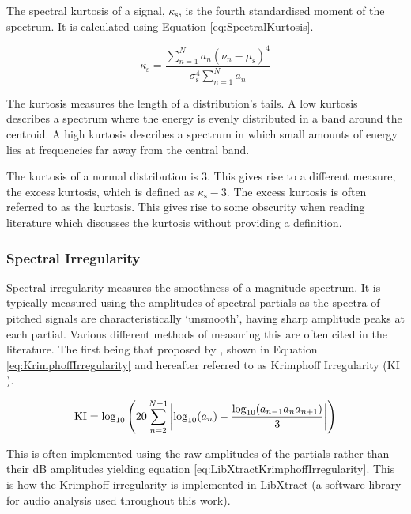 			The spectral kurtosis of a signal, $\kappa_{\mathrm{s}}$, is the fourth standardised moment of the
			spectrum. It is calculated using Equation \ref{eq:SpectralKurtosis}.

			\begin{equation}
				\kappa_{\mathrm{s}} = \frac{\sum_{n = 1}^{N} a_{n}(\nu_{n} - \mu_{\mathrm{s}})^{4}}
					{\sigma_{\mathrm{s}}^{4}\sum_{n = 1}^{N} a_{n}}
				\label{eq:SpectralKurtosis}
			\end{equation}

			The kurtosis measures the length of a distribution's tails. A low kurtosis describes a spectrum
			where the energy is evenly distributed in a band around the centroid. A high kurtosis describes a
			spectrum in which small amounts of energy lies at frequencies far away from the central band.

			The kurtosis of a normal distribution is 3. This gives rise to a different measure, the excess
			kurtosis, which is defined as $\kappa_{\mathrm{s}} - 3$. The excess kurtosis is often referred to
			as the kurtosis. This gives rise to some obscurity when reading literature which discusses the
			kurtosis without providing a definition.

		\subsubsection*{Spectral Irregularity}
			Spectral irregularity measures the smoothness of a magnitude spectrum. It is typically measured
			using the amplitudes of spectral partials as the spectra of pitched signals are characteristically
			`unsmooth', having sharp amplitude peaks at each partial. Various different methods of measuring
			this are often cited in the literature. The first being that proposed by
			\citet{krimphoff1994caracterisation}, shown in Equation \ref{eq:KrimphoffIrregularity} and
			hereafter referred to as Krimphoff Irregularity ($\mathrm{KI}$).

			\begin{equation}
				\mathrm{KI} = \log_{10} \left( 20 \sum_{n = 2}^{N - 1}
						   \left|\log_{10}(a_{n}) - \frac{\log_{10}(a_{n-1}a_{n}a_{n+1})}{3}\right|
						   \right)
				\label{eq:KrimphoffIrregularity}
			\end{equation}

			This is often implemented using the raw amplitudes of the partials rather than their dB amplitudes
			yielding equation \ref{eq:LibXtractKrimphoffIrregularity}. This is how the Krimphoff irregularity
			is implemented in LibXtract \citep{bullock2007libxtract} (a software library for audio analysis
			used throughout this work).


